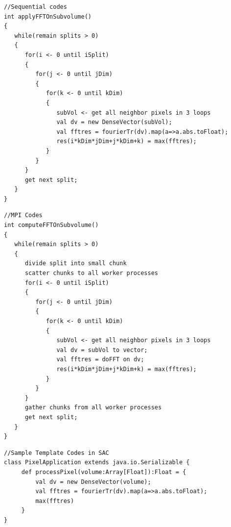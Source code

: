 \lstset{language=Java,frame=single}
\begin{lstlisting}[float,caption= Sequential Pseudo Codes of FFT on Sub-volume, label=SeqCodeFFT]
//Sequential codes
int applyFFTOnSubvolume() 
{
   while(remain splits > 0) 
   {
      for(i <- 0 until iSplit)
      {
         for(j <- 0 until jDim)
         {
            for(k <- 0 until kDim)
            {
               subVol <- get all neighbor pixels in 3 loops
               val dv = new DenseVector(subVol);
               val fftres = fourierTr(dv).map(a=>a.abs.toFloat); 
               res(i*kDim*jDim+j*kDim+k) = max(fftres);
            }
         }
      }
      get next split;
   }
}
\end{lstlisting}

\lstset{language=Java,frame=single}
\begin{lstlisting}[float,caption= Pseudo Codes of FFT on Sub-volume in MPI, label=MPICodeFFT]
//MPI Codes
int computeFFTOnSubvolume() 
{
   while(remain splits > 0) 
   {    
      divide split into small chunk
      scatter chunks to all worker processes
      for(i <- 0 until iSplit)
      {
         for(j <- 0 until jDim)
         {
            for(k <- 0 until kDim)
            {
               subVol <- get all neighbor pixels in 3 loops
               val dv = subVol to vector;
               val fftres = doFFT on dv; 
               res(i*kDim*jDim+j*kDim+k) = max(fftres);
            }
         }
      }
      gather chunks from all worker processes 
      get next split;
   }
}
\end{lstlisting}

\lstset{language=Java,frame=single}
\begin{lstlisting}[float,caption= Sample Codes of FFT on Sub-volume in Template of SAC,label=SACCodeFFT]
//Sample Template Codes in SAC
class PixelApplication extends java.io.Serializable {
     def processPixel(volume:Array[Float]):Float = {
         val dv = new DenseVector(volume);
         val fftres = fourierTr(dv).map(a=>a.abs.toFloat); 
         max(fftres)
     }
}
\end{lstlisting}


